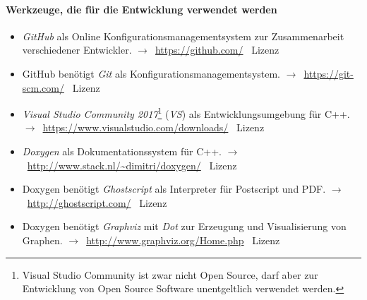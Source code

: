 \documentclass[english,ngerman,parskip=half,headsepline,footsepline]{scrreprt}
\newcounter{Enumi}
\begin{document}
	\paragraph{Werkzeuge, die für die Entwicklung verwendet werden}
	\begin{itemize}
		\setcounter{enumi}{\value{Enumi}}

		\item\label{Werkzeug:GitHub}\emph{GitHub} als Online Konfigurationsmanagementsystem zur Zusammenarbeit verschiedener Entwickler. $\rightarrow$~\url{https://github.com/} \textendash\ Lizenz \seename~\cite{bib:GPLii}

		\item\label{Werkzeug:Git}GitHub benötigt \emph{Git} als Konfigurationsmanagementsystem. $\rightarrow$~\url{https://git-scm.com/} \textendash\ Lizenz \seename~\cite{bib:GPLii}

		\item\label{Werkzeug:VSC}\emph{Visual Studio Community 2017}\footnote{Visual Studio Community ist zwar nicht Open Source, darf aber zur Entwicklung von Open Source Software unentgeltlich verwendet werden.} (\emph{VS}) als Entwicklungsumgebung für C++. $\rightarrow$~\url{https://www.visualstudio.com/downloads/} \textendash\ Lizenz \seename~\cite{bib:EULA}

		\item\label{Werkzeug:Doxygen}\emph{Doxygen} als Dokumentationssystem für C++. $\rightarrow$~\url{http://www.stack.nl/~dimitri/doxygen/} \textendash\ Lizenz \seename~\cite{bib:GPLii}

		\item\label{Werkzeug:Ghostscript}Doxygen benötigt \emph{Ghostscript} als Interpreter für Postscript und PDF. $\rightarrow$~\url{http://ghostscript.com/} \textendash\ Lizenz \seename~\cite{bib:AGPL}

		\item\label{Werkzeug:Graphviz}Doxygen benötigt \emph{Graphviz} mit \emph{Dot} zur Erzeugung und Visualisierung von Graphen. $\rightarrow$~\url{http://www.graphviz.org/Home.php} \textendash\ Lizenz \seename~\cite{bib:EPL}

		\setcounter{Enumi}{\value{enumi}}
	\end{itemize}
\end{document}
